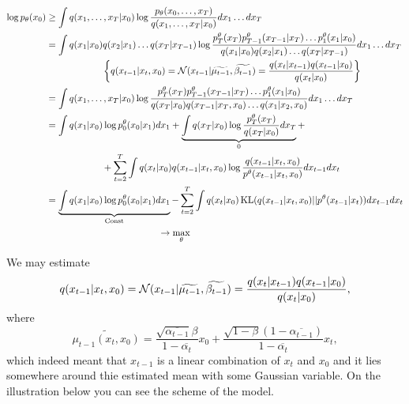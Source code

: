 \begin{equation*}
    \begin{aligned}
        \log p_\theta(x_0) &\geq \int q(x_1, \ldots, x_T | x_0) \log \frac{p_\theta(x_0, \ldots, x_T)}{q(x_1, \ldots, x_T | x_0)} d x_1 \ldots d x_T \\
        &= \int q(x_1 | x_0) q (x_2 | x_1) \ldots q(x_T | x_{T-1}) \log \frac{p^\theta_T(x_T) p^\theta_{T-1}(x_{T-1} | x_T) \ldots p^\theta_1(x_1 | x_0)}{q(x_1 | x_0) q(x_2 | x_1) \ldots q(x_T | x_{T-1})} d x_1 \ldots d x_T \\
        &\qquad \qquad \qquad\left\{ q(x_{t - 1} | x_t, x_0) = \operatorname{\mathcal{N}} (x_{t - 1} | \widetilde{\mu_{t - 1}}, \widetilde{\beta_{t - 1}}) = \frac{q(x_t | x_{t - 1}) q(x_{t - 1} | x_0)}{q(x_t | x_0)} \right\} \\ 
        &= \int q(x_1, \ldots, x_T | x_0) \log \frac{p^\theta_T(x_T) p^\theta_{T-1}(x_{T-1} | x_T) \ldots p^\theta_1(x_1 | x_0)}{q(x_T | x_0) q(x_{T-1} | x_T, x_0) \ldots q(x_1 | x_2, x_0)} d x_1 \ldots d x_T \\
        &= \int q(x_1 | x_0) \log p^\theta_0 (x_0 | x_1) d x_1 + \underbrace{\int q(x_T | x_0) \log \frac{p^\theta_T(x_T)}{q(x_T | x_0)} d x_T}_{0} + \\ 
        &\qquad \qquad \qquad+\sum_{t = 2}^T \int q(x_t | x_0) q(x_{t - 1} | x_t, x_0) \log \frac{q(x_{t - 1} | x_t, x_0)}{p^\theta(x_{t - 1} | x_t, x_0)} d x_{t - 1} d x_t \\
        &= \underbrace{\int q(x_1 | x_0) \log p^\theta_0 (x_0 | x_1) d x_1}_{\operatorname{Const}} - \sum_{t = 2}^T \int q(x_t | x_0) \operatorname{KL} (q(x_{t - 1} | x_t, x_0) || p^\theta(x_{t - 1} | x_t)) d x_{t - 1} d x_t \\ 
        &\qquad \qquad \qquad \qquad \qquad \qquad\to \max_{\theta}
    \end{aligned}
\end{equation*}

We may estimate 
\[ 
    q(x_{t - 1} | x_t, x_0) = \operatorname{\mathcal{N}} (x_{t - 1} | \widetilde{\mu_{t - 1}}, \widetilde{\beta_{t - 1}}) = \frac{q(x_t | x_{t - 1}) q(x_{t - 1} | x_0)}{q(x_t | x_0)},
\]
where 
\[ 
    \widetilde{\mu_{t - 1}(x_t, x_0)} = \frac{\sqrt{\overline{\alpha_{t - 1}}} \beta}{1 - \overline{\alpha_{t}}} x_0 + \frac{\sqrt{1 - \beta}(1 - \overline{\alpha_{t - 1}})}{1 - \overline{\alpha_t}}x_t,
\] 
which indeed meant that $x_{t-1}$ is a linear combination of $x_t$ and $x_0$ and it lies somewhere around thie estimated mean with some Gaussian variable. On the illustration below you can see the scheme of the model. \\ 

